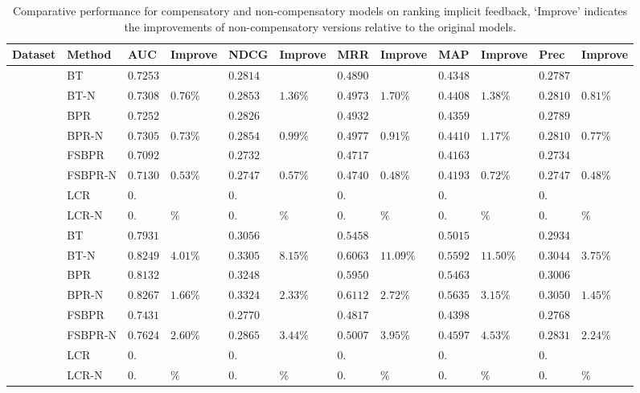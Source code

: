 \documentclass[letterpaper]{article} %
\begin{document}
\begin{table*}[ht]
\tiny
\caption{Comparative performance for compensatory and non-compensatory models on ranking implicit feedback, `Improve' indicates the improvements of non-compensatory versions relative to the original models.}
\begin{center}
\begin{tabular}{p{0.4cm}<{\centering}|p{1.2cm}<{\centering} |p{0.5cm} p{0.6cm} |p{0.5cm} p{0.6cm} |p{0.5cm} p{0.6cm}|p{0.5cm} p{0.6cm} |p{0.5cm} p{0.6cm}}
\hline
Dataset	& Method	& AUC	& Improve&	NDCG&	Improve&	MRR	&Improve &	MAP&	Improve&	Prec	&Improve\\\hline
{} &	BT	& $0.7253 $&  &$0.2814$& &$0.4890$&   &$0.4348$& 	& $0.2787$ 	&\\
	&BT-N	&$0.7308$ &	$0.76\%$	&$0.2853 $	&$1.36\%$	&$0.4973$ &	$1.70\%$	&$0.4408$ &	$1.38\%$	&$0.2810 $	&$0.81\%$\\
	&BPR&	$0.7252$ 	&&	$0.2826$ 	&&	$0.4932$ & &$0.4359$& 	& $0.2789$ 	&\\
	&BPR-N	&$0.7305$ 	&$0.73\%$	&$0.2854$ &	$0.99\%$	&$0.4977$ 	&$0.91\%$ &$0.4410$ &	$1.17\%$	&$0.2810 $	&$0.77\%$	\\
	&FSBPR		&$0.7092$&	&$0.2732$ 	&&	$0.4717$& &$0.4163$& 	& $0.2734$ 	&\\	
	&FSBPR-N	&$0.7130$	&$0.53\%$	&	$0.2747$ 	&$0.57\%$	&$0.4740$ 	&$0.48\%$ &$0.4193$ &	$0.72\%$	&$0.2747 $	&$0.48\%$	\\
	&LCR		&$0.$&	&$0.$ 	&&	$0.$& &$0.$& 	& $0.$ 	&\\	
	&LCR-N	&$0.$	&$\%$	&	$0.$ 	&$\%$	&$0.$ 	&$\%$ &$0.$ &	$\%$	&$0. $	&$\%$\\

	\hline
{}	&	BT	& $0.7931 $&  &$0.3056$& &$0.5458$&   &$0.5015$& 	& $0.2934$ 	&\\
	&BT-N	&$0.8249$ &	$4.01\%$	&$0.3305 $	&$8.15\%$	&$0.6063$ &	$11.09\%$	&$0.5592$ &	$11.50\%$	&$0.3044 $	&$3.75\%$\\
	&BPR&	$0.8132$ 	&&	$0.3248$ 	&&	$0.5950$ & &$0.5463$& 	& $0.3006$ 	&\\
	&BPR-N	&$0.8267$ 	&$1.66\%$	&$0.3324$ &	$2.33\%$	&$0.6112$ 	&$2.72\%$ &$0.5635$ &	$3.15\%$	&$0.3050 $	&$1.45\%$	\\
	&FSBPR		&$0.7431$&	&$0.2770$ 	&&	$0.4817$& &$0.4398$& 	& $0.2768$ 	&\\	
	&FSBPR-N	&$0.7624$	&$2.60\%$	&	$0.2865$ 	&$3.44\%$	&$0.5007$ 	&$3.95\%$ &$0.4597$ &	$4.53\%$	&$0.2831 $	&$2.24\%$	\\
	&LCR		&$0.$&	&$0.$ 	&&	$0.$& &$0.$& 	& $0.$ 	&\\	
	&LCR-N	&$0.$	&$\%$	&	$0.$ 	&$\%$	&$0.$ 	&$\%$ &$0.$ &	$\%$	&$0. $	&$\%$\\


\end{tabular}
\end{center}
\end{table*}
\end{document}
